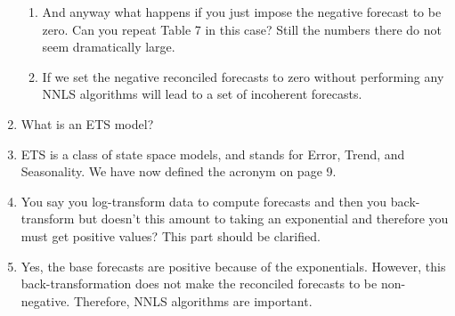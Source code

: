 \documentclass[10pt,a4paper]{article}
\begin{document}
\begin{enumerate}
\begin{enumerate}
	\item And anyway what happens if you just impose the negative forecast to be zero. Can you repeat Table 7 in this case? Still the numbers there do not seem dramatically large.
	\item [] {\color{blue} If we set the negative reconciled forecasts to zero without performing any NNLS algorithms will lead to a set of incoherent forecasts.}
\end{enumerate}
\item What is an ETS model?
\item [] {\color{blue} ETS is a class of state space models, and stands for Error, Trend, and Seasonality. We have now defined the acronym on page 9.}
\item You say you log-transform data to compute forecasts and then you back-transform but doesn't this amount to taking an exponential and therefore you must get positive values? This part should be clarified.  
\item [] {\color{blue} Yes, the base forecasts are positive because of the exponentials. However, this back-transformation does not make the reconciled forecasts to be non-negative. Therefore, NNLS algorithms are important.} 
\end{enumerate}
\end{document}
